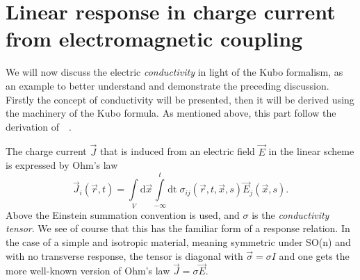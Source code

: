 \section[Charge response from electromagnetic coupling]{Linear response in charge current from electromagnetic coupling}
We will now discuss the electric \emph{conductivity} in light of the Kubo formalism, as an example to better understand and demonstrate the preceding discussion.
Firstly the concept of conductivity will be presented, then it will be derived using the machinery of the Kubo formula.
As mentioned above, this part follow the derivation of~\citeauthor{mahanManyparticlePhysics2000}~\cite{mahanManyparticlePhysics2000}.

The charge current $\vec{J}$ that is induced from an electric field $\vec{E}$ in the linear scheme is expressed by Ohm's law
\begin{equation}
  \label{eq:ohm}
  \vec{J}_i(\vec{r}, t) =
  \int\limits_{V} \mathrm{d} \vec{x} \!\int\limits_{-\infty}^t \mathrm{dt} \;
  \sigma_{ij}(\vec{r}, t, \vec{x}, s)
  \vec{E}_j(\vec{x}, s).
\end{equation}
Above the Einstein summation convention is used, and $\sigma$ is the \emph{conductivity tensor}.
We see of course that this has the familiar form of a response relation.
In the case of a simple and isotropic material, meaning symmetric under SO(n) and with no transverse response, the tensor is diagonal with $\vec{\sigma} = \sigma I$ and one gets the more well-known version of Ohm's law $\vec{J} = \sigma \vec{E}$.

